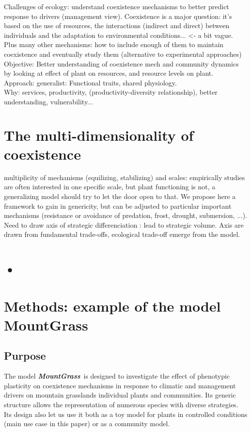 \documentclass[review]{elsarticle}
\newcommand{\model}{\textbf{\textit{MountGrass}}~}
\begin{document}
Challenges of ecology: understand coexistence mechanisms to better predict response to drivers (management view). Coexistence is a major question: it's based on the use of resources, the interactions (indirect and direct) between individuals and the adaptation to environmental conditions... <- a bit vague. Plus many other mechanisms: how to include enough of them to maintain coexistence and eventually study them (alternative to experimental approaches)\\
Objective: Better understanding of coexistence mech and community dynamics by looking at effect of plant on resources, and resource levels on plant.\\
Approach: generalist: Functional traits, shared physiology.\\
Why: services, productivity, (productivity-diversity relationship), better understanding, vulnerability...


\section{The multi-dimensionality of coexistence}
multiplicity of mechanisms (equilizing, stabilizing) and scales: empirically studies are often interested in one specific scale, but plant functioning is not, a generalizing model should try to let the door open to that. We propose here a framework to gain in genericity, but can be adjusted to particular important mechanisms (resistance or avoidance of predation, frost, drought, submersion, ...).\\
Need to draw axis of strategic differenciation : lead to strategic volume. Axis are drawn from fundamental trade-offs, ecological trade-off emerge from the model.


\section{•}

\section{Methods: example of the model MountGrass}
\subsection{Purpose}
The model \model is designed to investigate the effect of phenotypic plasticity on coexistence mechanisms in response to climatic and management drivers on mountain grasslands individual plants and communities. Its generic structure allows the representation of numerous species with diverse strategies. Its design also let us use it both as a toy model for plants in controlled conditions (main use case in this paper) or as a community model.\\
\end{document}
